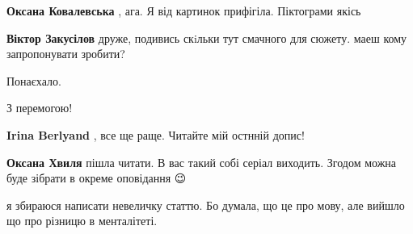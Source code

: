 \begin{itemize}
\begin{itemize}
\textbf{Оксана Ковалевська} , ага. Я від картинок прифігіла. Піктограми якісь
\end{itemize}

 
\textbf{Віктор Закусілов} друже, подивись скiльки тут смачного для сюжету. маеш кому запропонувати зробити?

 
Понаєхало.

 
З перемогою!

\begin{itemize}
 
\textbf{Irina Berlyand} , все ще раще. Читайте мій остнній допис!

 
\textbf{Оксана Хвиля} пішла читати. В вас такий собі серіал виходить. Згодом можна буде зібрати в окреме оповідання 😉

 
я збираюся написати невеличку статтю. Бо думала, що це про мову, але вийшло що про різницю в менталітеті.
\end{itemize}


\end{itemize}
